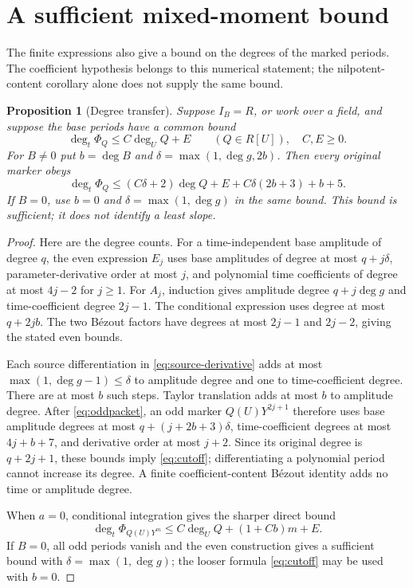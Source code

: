 \documentclass[11pt]{article}
\newtheorem{proposition}[theorem]{Proposition}
\theoremstyle{definition}\newtheorem{definition}[theorem]{Definition}
\theoremstyle{remark}\newtheorem{remark}[theorem]{Remark}
\begin{document}
\section{A sufficient mixed-moment bound}

The finite expressions also give a bound on the degrees of the marked
periods. The coefficient hypothesis belongs to this numerical statement;
the nilpotent-content corollary alone does not supply the same bound.

\begin{proposition}[Degree transfer]\label{prop:degreetransfer}
Suppose $I_B=R$, or work over a field, and suppose the base periods
have a common bound
\[
 \deg_t\Phi_Q\le C\deg_UQ+E\qquad(Q\in R[U]),\quad C,E\ge0.
\]
For $B\ne0$ put $b=\deg B$ and
$\delta=\max(1,\deg g,2b)$. Then every original marker obeys
\begin{equation}\label{eq:cutoff}
 \deg_t\Phi_Q\le(C\delta+2)\deg Q
                    +E+C\delta(2b+3)+b+5.
\end{equation}
If $B=0$, use $b=0$ and $\delta=\max(1,\deg g)$ in the same bound.
This bound is sufficient; it does not identify a least slope.
\end{proposition}
\begin{proof}
Here are the degree counts. For a time-independent base amplitude
of degree $q$, the even expression $E_j$ uses base amplitudes of degree
at most $q+j\delta$, parameter-derivative order at most $j$, and
polynomial time coefficients of degree at most $4j-2$ for $j\ge1$.
For $A_j$, induction gives amplitude degree $q+j\deg g$ and
time-coefficient degree $2j-1$. The conditional expression uses
degree at most $q+2jb$. The two B\'ezout factors have degrees
at most $2j-1$ and $2j-2$, giving the stated even bounds.

Each source differentiation in \eqref{eq:source-derivative} adds
at most $\max(1,\deg g-1)\le\delta$ to amplitude degree and
one to time-coefficient degree. There are at most $b$ such steps.
Taylor translation adds at most $b$ to amplitude degree.
After \eqref{eq:oddpacket}, an odd marker $Q(U)Y^{2j+1}$ therefore
uses base amplitude degrees at most $q+(j+2b+3)\delta$,
time-coefficient degrees at most $4j+b+7$, and derivative order
at most $j+2$. Since its original degree is $q+2j+1$, these
bounds imply \eqref{eq:cutoff}; differentiating a polynomial
period cannot increase its degree. A finite coefficient-content
B\'ezout identity adds no time or amplitude degree.

When $a=0$, conditional integration gives the sharper direct bound
\[
 \deg_t\Phi_{Q(U)Y^m}\le C\deg_UQ+(1+Cb)m+E.
\]
If $B=0$, all odd periods vanish and the even construction gives
a sufficient bound with $\delta=\max(1,\deg g)$; the looser
formula \eqref{eq:cutoff} may be used with $b=0$.
\end{proof}
\end{document}
